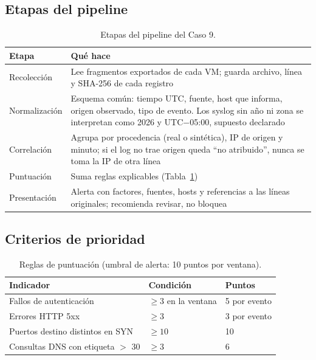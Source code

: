 \subsection{Etapas del pipeline}
\begin{table}[H]\centering\small\caption{Etapas del pipeline del Caso 9.}
\begin{tabularx}{\linewidth}{@{}p{2.8cm}X@{}}\toprule
\textbf{Etapa} & \textbf{Qué hace}\\\midrule
Recolección & Lee fragmentos exportados de cada VM; guarda archivo, línea y SHA-256 de cada registro\\
Normalización & Esquema común: tiempo UTC, fuente, host que informa, origen observado, tipo de evento. Los syslog sin año ni zona se interpretan como 2026 y UTC$-$05:00, supuesto declarado\\
Correlación & Agrupa por procedencia (real o sintética), IP de origen y minuto; si el log no trae origen queda ``no atribuido'', nunca se toma la IP de otra línea\\
Puntuación & Suma reglas explicables (Tabla~\ref{tab:prio})\\
Presentación & Alerta con factores, fuentes, hosts y referencias a las líneas originales; recomienda revisar, no bloquea\\
\bottomrule\end{tabularx}\end{table}

\subsection{Criterios de prioridad}
\begin{table}[H]\centering\small\caption{Reglas de puntuación (umbral de alerta: 10 puntos por ventana).}\label{tab:prio}
\begin{tabular}{@{}lll@{}}\toprule
\textbf{Indicador} & \textbf{Condición} & \textbf{Puntos}\\\midrule
Fallos de autenticación & $\geq 3$ en la ventana & 5 por evento\\
Errores HTTP 5xx & $\geq 3$ & 3 por evento\\
Puertos destino distintos en SYN & $\geq 10$ & 10\\
Consultas DNS con etiqueta $>$ 30 & $\geq 3$ & 6\\
\bottomrule\end{tabular}\end{table}

